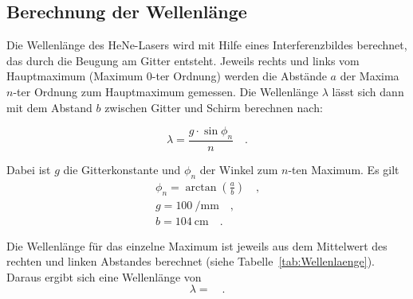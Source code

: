  \subsection{Berechnung der Wellenlänge}
 Die Wellenlänge des HeNe-Lasers wird mit Hilfe eines Interferenzbildes berechnet, das durch die Beugung am Gitter entsteht. Jeweils rechts und links vom Hauptmaximum (Maximum 0-ter Ordnung) werden die Abstände $a$ der Maxima $n$-ter Ordnung zum Hauptmaximum gemessen. Die Wellenlänge $\lambda$ lässt sich dann mit dem Abstand $b$ zwischen Gitter und Schirm berechnen nach:
 
 \begin{equation}
 \lambda = \frac{g \cdot \sin{\phi_n}}{n} \quad .
 \end{equation}
 
Dabei ist $g$ die Gitterkonstante und $\phi_n$ der Winkel zum $n$-ten Maximum.
Es gilt
\begin{align}
\phi_n = \arctan{\left( \frac{a}{b} \right)} \quad \textrm{,}\\
g = \SI{100}{\per\milli\meter} \quad \textrm{,}\\
b = \SI{104}{\centi\meter} \quad .
\end{align}
 
 Die Wellenlänge für das einzelne Maximum ist jeweils aus dem Mittelwert des rechten und linken Abstandes berechnet (siehe Tabelle~\ref{tab:Wellenlaenge}). Daraus ergibt sich eine Wellenlänge von
\begin{equation}
\lambda =  \quad .
\end{equation}
